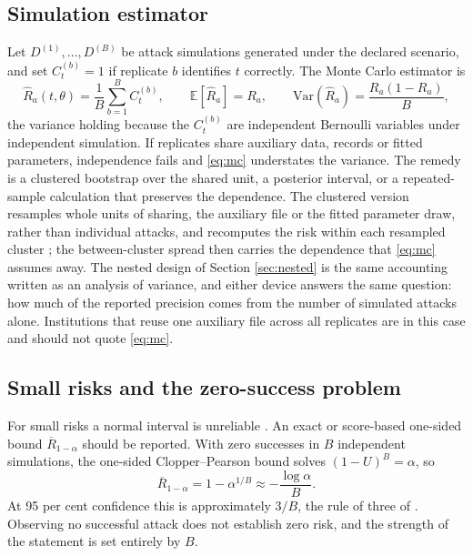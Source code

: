 \documentclass[11pt,a4paper]{article}
\theoremstyle{plain}
\theoremstyle{definition}
\newcommand{\E}{\mathbb{E}}
\begin{document}
\subsection{Simulation estimator}

Let $D^{(1)}, \dots, D^{(B)}$ be attack simulations generated under the
declared scenario, and set $C_t^{(b)} = 1$ if replicate $b$ identifies $t$
correctly. The Monte Carlo estimator is
\begin{equation}
\widehat{R}_a(t, \theta) = \frac{1}{B}\sum_{b=1}^{B} C_t^{(b)},
\qquad
\E[\widehat{R}_a] = R_a, \qquad
\mathrm{Var}(\widehat{R}_a) = \frac{R_a(1 - R_a)}{B} ,
\label{eq:mc}
\end{equation}
the variance holding because the $C_t^{(b)}$ are independent Bernoulli
variables under independent simulation. If replicates share auxiliary data,
records or fitted parameters, independence fails and \eqref{eq:mc} understates
the variance. The remedy is a clustered bootstrap over the shared unit, a
posterior interval, or a repeated-sample calculation that preserves the
dependence. The clustered version resamples whole units of sharing, the
auxiliary file or the fitted parameter draw, rather than individual attacks, and
recomputes the risk within each resampled cluster
\citep{efron1993,vandervaart1998}; the between-cluster spread then carries the
dependence that \eqref{eq:mc} assumes away. The nested design of Section
\ref{sec:nested} is the same accounting written as an analysis of variance, and
either device answers the same question: how much of the reported precision comes
from the number of simulated attacks alone. Institutions that reuse one auxiliary
file across all replicates are in this case and should not quote
\eqref{eq:mc}.

\subsection{Small risks and the zero-success problem}

For small risks a normal interval is unreliable \citep{brown2001}. An exact or
score-based one-sided bound $\overline{R}_{1-\alpha}$ should be reported. With zero
successes in $B$ independent simulations, the one-sided Clopper--Pearson bound
\citep{clopper1934} solves $(1 - U)^B = \alpha$, so
\begin{equation}
\overline{R}_{1-\alpha} = 1 - \alpha^{1/B} \approx -\frac{\log \alpha}{B} .
\label{eq:cp0}
\end{equation}
At 95 per cent confidence this is approximately $3/B$, the rule of three of
\citet{hanley1983}. Observing no successful
attack does not establish zero risk, and the strength of the statement is set
entirely by $B$.
\end{document}
